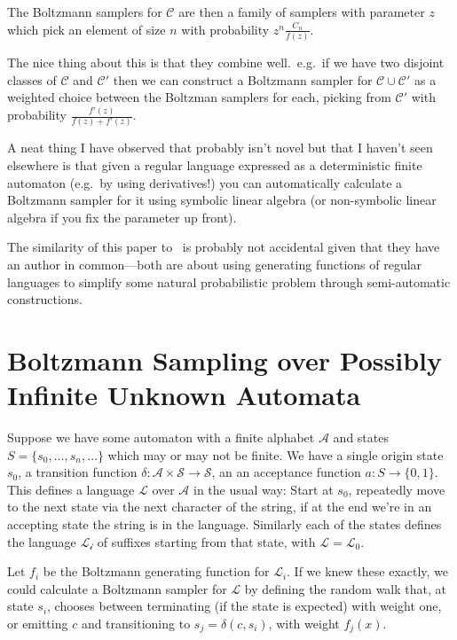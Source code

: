 \documentclass[a4paper]{book}
\begin{document}
The Boltzmann samplers for \(\mathcal{C}\) are then a family of samplers with parameter \(z\) which pick an element of size \(n\) with probability \(z^n \frac{C_n}{f(z)}\).

The nice thing about this is that they combine well.\ 
e.g.\ if we have two disjoint classes of \(\mathcal{C}\) and \(\mathcal{C}'\) then we can construct a Boltzmann sampler for \(\mathcal{C} \cup \mathcal{C}'\) as a weighted choice between the Boltzman samplers for each,
picking from \(\mathcal{C}'\) with probability \(\frac{f'(z)}{f(z) + f'(z)}\).

A neat thing I have observed\cite{falbs} that probably isn't novel but that I haven't seen elsewhere is that given a regular language expressed as a deterministic finite automaton
(e.g.\ by using derivatives!)
you can automatically calculate a Boltzmann sampler for it using symbolic linear algebra
(or non-symbolic linear algebra if you fix the parameter up front).

The similarity of this paper to~\cite{DBLP:journals/dam/FlajoletGT92} is probably not accidental given that they have an author in common---both
are about using generating functions of regular languages to simplify some natural probabilistic problem through semi-automatic constructions.

\section{Boltzmann Sampling over Possibly Infinite Unknown Automata}

Suppose we have some automaton with a finite alphabet \(\mathcal{A}\) and states \(S = \{s_0, \ldots, s_n, \ldots\}\) which may or may not be finite.
We have a single origin state \(s_0\),
a transition function \(\delta: \mathcal{A} \times \mathcal{S} \to \mathcal{S}\),
an an acceptance function \(a: S \to \{0, 1\}\).
This defines a language \(\mathcal{L}\) over \(\mathcal{A}\) in the usual way:
Start at \(s_0\), repeatedly move to the next state via the next character of the string,
if at the end we're in an accepting state the string is in the language.
Similarly each of the states defines the language \(\mathcal{L_i}\) of suffixes starting from that state,
with \(\mathcal{L} = \mathcal{L}_0\).

Let \(f_i\) be the Boltzmann generating function for \(\mathcal{L}_i\).
If we knew these exactly,
we could calculate a Boltzmann sampler for \(\mathcal{L}\) by defining the random walk that,
at state \(s_i\),
chooses between terminating (if the state is expected) with weight one,
or emitting \(c\) and transitioning to \(s_j = \delta(c, s_i)\),
with weight \(f_j(x)\).
\end{document}
